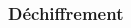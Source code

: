         \begin{frame}
            \frametitle{Déchiffrement}
            \begin{columns}
                \begin{column}{.45\linewidth}
                \end{column}
                \pause
                \begin{column}{.45\linewidth}
                \end{column}
            \end{columns}
        \end{frame}

